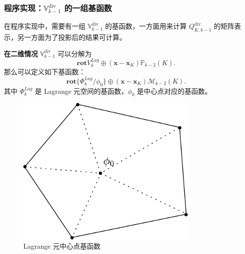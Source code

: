 \documentclass[notheorems,serif]{beamer}
\begin{document}
\begin{frame}
    \frametitle{程序实现：$\mathbb{V}^{\mathrm{div}}_{k-1}$ 的一组基函数}
    \begin{minipage}[b]{0.6\linewidth}
    在程序实现中，需要有一组 $\mathbb{V}^{\mathrm{div}}_{k-1}$
    的基函数，一方面用来计算 $Q_{K, k-1}^{\mathrm{div}}$
    的矩阵表示，另一方面为了投影后的结果可计算。

    \textbf{在二维情况}
    $\mathbb{V}^{\mathrm{div}}_{k-1}$ 可以分解为
    $$
    \mathbf{rot} V^{Lag}_k \oplus (\mathbf{x-x}_K)\mathbb{P}_{k-2}(K). 
    $$
    那么可以定义如下基函数：
    $$
    \mathbf{rot} \{\Phi^{Lag}_k/\phi_0\} \oplus (\mathbf{x-x}_K)
    \mathcal{M}_{k-2}(K).
    $$
    其中 $\Phi^{Lag}_k$ 是 Lagrange 元空间的基函数，$\phi_0$
    是中心点对应的基函数。
\end{minipage}
\hfill
\begin{minipage}[b]{0.38\linewidth}
    \centering
    \begin{figure}[htpb]
        \centering
        \includegraphics[width=0.8\textwidth]{../figures/lagrange_phi0.pdf}
        \caption{Lagrange 元中心点基函数}
    \end{figure}
\vspace{30pt}
\end{minipage}
\end{frame}
\end{document}
